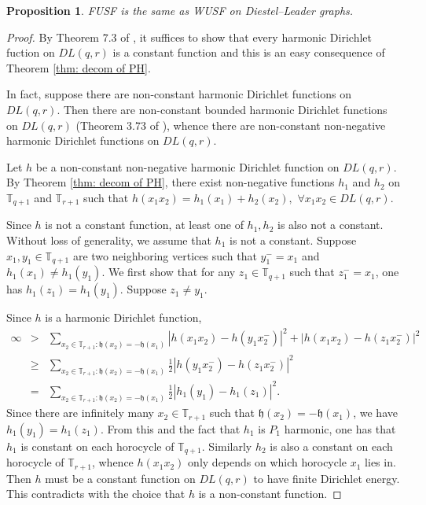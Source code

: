 \documentclass[12pt]{article}
\newtheorem{proposition}[theorem]{Proposition}
\numberwithin{equation}{section}
\newcommand{\1}{\mathbf{1}}
\begin{document}
 \begin{proposition}\label{prop: FUSF=WUSF on DL graphs}
 	FUSF is the same as WUSF on Diestel--Leader graphs. 
 \end{proposition}
 \begin{proof}
 	By Theorem 7.3 of \cite{BLPS2001}, it suffices to show that every harmonic Dirichlet fuction on $DL(q,r)$ is a constant function and this is an easy consequence of Theorem \ref{thm: decom of PH}. 
 	
 	In fact, suppose there are non-constant harmonic Dirichlet functions on $DL(q,r)$. Then there are non-constant bounded harmonic Dirichlet functions on $DL(q,r)$ (Theorem 3.73 of \cite{Soardi1994}), whence there are non-constant non-negative harmonic Dirichlet  functions on $DL(q,r)$. 
 	
 	Let $h$ be a  non-constant non-negative harmonic Dirichlet  function on $DL(q,r)$.  By Theorem \ref{thm: decom of PH}, there exist non-negative functions $h_1$ and $h_2$ on 
 	$\mathbb{T}_{q+1}$ and $\mathbb{T}_{r+1}$ such that $	h(x_1x_2)=h_1(x_1)+h_2(x_2),\, \, \forall x_1x_2\in DL(q,r)$.
 	
 	Since $h$ is not a constant function, at least one of $h_1,h_2$ is also not a constant. Without loss of generality, we assume that $h_1$ is not a constant. Suppose $x_1,y_1\in\mathbb{T}_{q+1}$ are two neighboring vertices such that $y_1^-=x_1$ and $h_1(x_1)\neq h_1(y_1)$. We first show that for any $z_1\in\mathbb{T}_{q+1}$ such that $z_1^-=x_1$, one has $h_1(z_1)=h_1(y_1)$. Suppose $z_1\neq y_1$. 
 	
 	Since $h$ is a harmonic Dirichlet function, 
 	\begin{eqnarray}
 	\infty&>&\sum_{x_2\in \mathbb{T}_{r+1}:\mathfrak{h}(x_2)=-\mathfrak{h}(x_1)}|h(x_1x_2)-h(y_1x_2^-)|^2+
 	|h(x_1x_2)-h(z_1x_2^-)|^2\nonumber\\
 	&\geq&\sum_{x_2\in \mathbb{T}_{r+1}:\mathfrak{h}(x_2)=-\mathfrak{h}(x_1)}\frac{1}{2}|h(y_1x_2^-)-h(z_1x_2^-)|^2
 	\nonumber\\
    &=&	\sum_{x_2\in \mathbb{T}_{r+1}:\mathfrak{h}(x_2)=-\mathfrak{h}(x_1)}\frac{1}{2}|h_1(y_1)-h_1(z_1)|^2.
 	\end{eqnarray}
Since there are infinitely many $x_2\in \mathbb{T}_{r+1}$ such that $\mathfrak{h}(x_2)=-\mathfrak{h}(x_1)$, we have $h_1(y_1)=h_1(z_1)$. From this and the fact that $h_1$ is $P_1$ harmonic, one has that $h_1$ is constant on each horocycle of $\mathbb{T}_{q+1}$.  Similarly $h_2$ is also a constant on each horocycle of $\mathbb{T}_{r+1}$, whence $h(x_1x_2)$ only depends on which horocycle $x_1$ lies in. Then $h$ must be a constant function on $DL(q,r)$ to have finite Dirichlet energy. This contradicts with the choice that $h$ is a non-constant function. 
 \end{proof}
 
\end{document}
